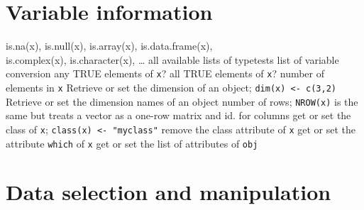 \section{Variable information}{{\smalltt is.na(x), is.null(x), is.array(x), is.data.frame(x), \\is.complex(x), is.character(x), \ldots}}
	{all available lists of typetests}
	{list of variable conversion}
	{any TRUE elements of {\tt x}?}
	{all TRUE elements of {\tt x}?}
	{ number of elements in {\tt x}}
	{Retrieve or set the dimension of an object; {\tt dim(x) <- c(3,2)}}
	{Retrieve or set the dimension names of an object}
	{number of rows; {\tt NROW(x)} is the same but treats a vector as a one-row matrix}
	{and}
	{id. for columns}
	{get or set the class of {\tt x}; {\tt class(x) <- "myclass"}}
	{remove the class attribute of {\tt x}}
	{get or set the attribute {\tt which} of {\tt x}}
	{get or set the list of attributes of {\tt obj}}

\section{Data selection and manipulation}{}

